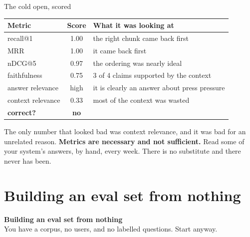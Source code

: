 \documentclass[aspectratio=169]{beamer}
\newcommand{\takebox}[1]{%
  \begin{tcolorbox}[colback=paramgreen!8, colframe=paramgreen, boxrule=0.6pt, arc=2pt]
  #1
  \end{tcolorbox}}
\newcommand{\sectiontransition}[2]{%
  \begin{frame}[plain]
    \vfill
    \begin{center}
      {\Huge\bfseries\color{popblue} #1}\\[1.1em]
      {\large #2}
    \end{center}
    \vfill
  \end{frame}}
\begin{document}
\begin{frame}{The cold open, scored}
  \vspace{0.3em}
  \begin{center}
  \small
  \begin{tabular}{lcl}
    \toprule
    \textbf{Metric} & \textbf{Score} & \textbf{What it was looking at} \\
    \midrule
    recall@1              & 1.00 & the right chunk came back first \\
    MRR                   & 1.00 & it came back first \\
    nDCG@5                & 0.97 & the ordering was nearly ideal \\
    faithfulness          & 0.75 & 3 of 4 claims supported by the context \\
    answer relevance      & high & it is clearly an answer about press pressure \\
    context relevance     & 0.33 & most of the context was wasted \\
    \midrule
    \textbf{correct?}     & \color{armred}\textbf{no} & \\
    \bottomrule
  \end{tabular}
  \end{center}

  \vspace{0.4em}
  \takebox{The only number that looked bad was context relevance, and it was bad for an
  unrelated reason. \textbf{Metrics are necessary and not sufficient.} Read some of your
  system's answers, by hand, every week. There is no substitute and there never has been.}
\end{frame}

\section{Building an eval set from nothing}
\sectiontransition{Building an eval set from nothing}{You have a corpus, no users, and no
labelled questions. Start anyway.}
\end{document}
